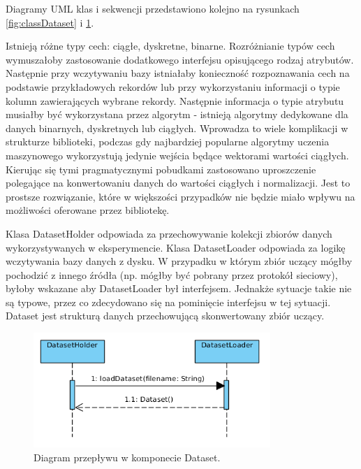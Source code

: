 \documentclass[12pt]{article}
\begin{document}
Diagramy UML klas i sekwencji przedstawiono kolejno na rysunkach \ref{fig:classDataset} i \ref{fig:sequenceDataset}.

Istnieją różne typy cech: ciągłe, dyskretne, binarne. Rozróżnianie typów cech wymuszałoby zastosowanie dodatkowego interfejsu opisującego rodzaj atrybutów. Następnie przy wczytywaniu bazy istniałaby konieczność rozpoznawania cech na podstawie przykładowych rekordów lub przy wykorzystaniu informacji o typie kolumn zawierających wybrane rekordy. Następnie informacja o typie atrybutu musiałby być wykorzystana przez algorytm - istnieją algorytmy dedykowane dla danych binarnych, dyskretnych lub ciągłych. Wprowadza to wiele komplikacji w strukturze biblioteki, podczas gdy najbardziej popularne algorytmy uczenia maszynowego wykorzystują jedynie wejścia będące wektorami wartości ciągłych. Kierując się tymi pragmatycznymi pobudkami zastosowano uproszczenie polegające na konwertowaniu danych do wartości ciągłych i normalizacji. Jest to prostsze rozwiązanie, które w większości przypadków nie będzie miało wpływu na możliwości oferowane przez bibliotekę.

Klasa DatasetHolder odpowiada za przechowywanie kolekcji zbiorów danych wykorzystywanych w eksperymencie. Klasa DatasetLoader odpowiada za logikę wczytywania bazy danych z dysku. W przypadku w którym zbiór uczący mógłby pochodzić z innego źródła (np. mógłby być pobrany przez protokół sieciowy), byłoby wskazane aby DatasetLoader był interfejsem. Jednakże sytuacje takie nie są typowe, przez co zdecydowano się na pominięcie interfejsu w tej sytuacji. Dataset jest strukturą danych przechowującą skonwertowany zbiór uczący.

\newpage
\begin{figure}[!h]
	\centering
	\includegraphics[width=0.8\textwidth]{img/sequenceDataset.png}
	\caption{Diagram przepływu w komponecie Dataset.}
	\label{fig:sequenceDataset}
\end{figure}
\end{document}
